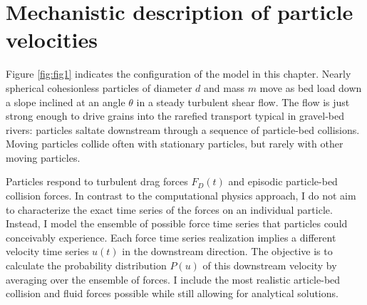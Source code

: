 \section{Mechanistic description of particle velocities}
\label{sec:langmodel}

Figure \ref{fig:fig1} indicates the configuration of the model in this chapter.
Nearly spherical cohesionless particles of diameter $d$ and mass $m$ move as bed load down a slope inclined at an angle $\theta$ in a steady turbulent shear flow.
The flow is just strong enough to drive grains into the rarefied transport typical in gravel-bed rivers: particles saltate downstream through a sequence of particle-bed collisions. 
Moving particles collide often with stationary particles, but rarely with other moving particles.

Particles respond to turbulent drag forces $F_D(t)$ and episodic particle-bed collision forces. In contrast to the computational physics approach, I do not aim to characterize the exact time series of the forces on an individual particle. Instead, I model the ensemble of possible force time series that particles could conceivably experience. Each force time series realization implies a different velocity time series $u(t)$ in the downstream direction.
The objective is to calculate the probability distribution $P(u)$ of this downstream velocity by averaging over the ensemble of forces.
I include the most realistic article-bed collision and fluid forces possible while still allowing for analytical solutions. 

